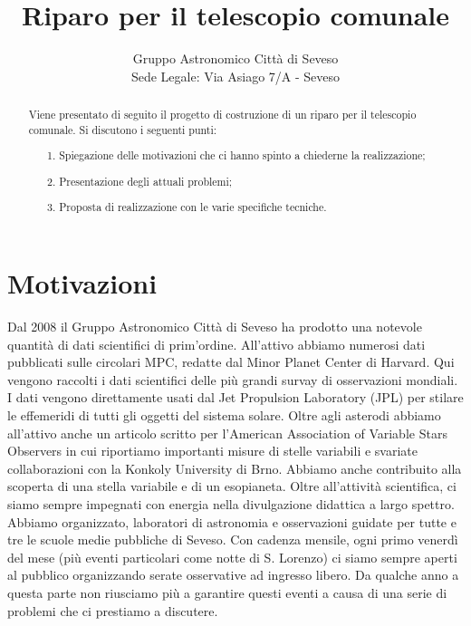 \documentclass[a4paper,12pt]{article}
\begin{document}
\title{\bf \Huge Riparo per il telescopio comunale\\ }


\author{Gruppo Astronomico Città di Seveso\\
Sede Legale: Via Asiago 7/A - Seveso
}


\maketitle
\begin{abstract}
Viene presentato di seguito il progetto di costruzione di un riparo per il telescopio comunale. Si discutono i seguenti punti:
	\begin{itemize}
		\item[1.] Spiegazione delle motivazioni che ci hanno spinto a chiederne la realizzazione;
		\item[2.] Presentazione degli attuali problemi;
		\item[3.] Proposta di realizzazione con le varie specifiche tecniche.
	\end{itemize}
\end{abstract}

\section{Motivazioni}
Dal 2008 il Gruppo Astronomico Citt\`a di Seveso ha prodotto una notevole quantit\`a di dati scientifici di prim'ordine. All'attivo abbiamo numerosi dati pubblicati sulle circolari MPC, redatte dal Minor Planet Center di Harvard. Qui vengono raccolti i dati scientifici delle pi\`u grandi survay di osservazioni mondiali. I dati vengono direttamente usati dal Jet Propulsion Laboratory (JPL) per stilare le effemeridi di tutti gli oggetti del sistema solare. Oltre agli asterodi abbiamo all'attivo anche un articolo scritto per l'American Association of Variable Stars Observers in cui riportiamo importanti misure di stelle variabili e svariate collaborazioni con la Konkoly University di Brno. Abbiamo anche contribuito alla scoperta di una stella variabile e di un esopianeta. Oltre all'attivit\`a scientifica, ci siamo sempre impegnati con energia nella divulgazione didattica a largo spettro. Abbiamo organizzato, laboratori di astronomia e osservazioni guidate per tutte e tre le scuole medie pubbliche di Seveso. Con cadenza mensile, ogni primo venerd\`i del mese (pi\`u eventi particolari come notte di S. Lorenzo) ci siamo sempre aperti al pubblico organizzando serate osservative ad ingresso libero. Da qualche anno a questa parte non riusciamo pi\`u a garantire questi eventi a causa di una serie di problemi che ci prestiamo a discutere.
\end{document}
